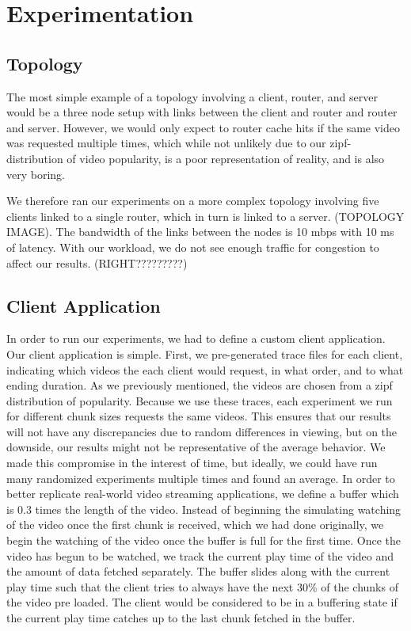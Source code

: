 \section{Experimentation} \label{sec:experimentation}

\subsection{Topology} \label{sec:topology}

The most simple example of a topology involving a client, router, and server
would be a three node setup with links between the client and router and router
and server. However, we would only expect to router cache hits if the same video
was requested multiple times, which while not unlikely due to our
zipf-distribution of video popularity, is a poor representation of reality, and
is also very boring.

We therefore ran our experiments on a more complex topology involving five
clients linked to a single router, which in turn is linked to a server.
(TOPOLOGY IMAGE). The bandwidth of the links between the nodes is 10  mbps with
10 ms of latency. With our workload, we do not  see enough traffic for
congestion to affect our results. (RIGHT?????????)

\subsection{Client Application} \label{sec:client}

In order to run our experiments, we had to define a custom client application.
Our client application is simple. First, we pre-generated trace files for each
client, indicating which videos the each client would request, in what order,
and to what ending duration. As we previously mentioned, the videos are chosen
from a zipf distribution of popularity. Because we use these traces, each
experiment we run for different chunk sizes requests the same videos. This
ensures that our results will not have any discrepancies due to random
differences in viewing, but on the downside, our results might not be
representative of the average behavior. We made this compromise in the interest
of time, but ideally, we could have run many randomized experiments multiple
times and found an average.
In order to better replicate real-world video streaming applications, we define
a buffer which is 0.3 times the length of the video. Instead of beginning the
simulating watching of the video once the first chunk is received, which we had
done originally, we begin the watching of the video once the buffer is full for
the first time. Once the video has begun to be watched, we track the current
play time of the video and the amount of data fetched separately. The buffer
slides along with the current play time such that the client tries to always
have the next 30\% of the chunks of the video pre loaded. The client would be
considered to be in a buffering state if the current play time catches up to the
last chunk fetched in the buffer.

